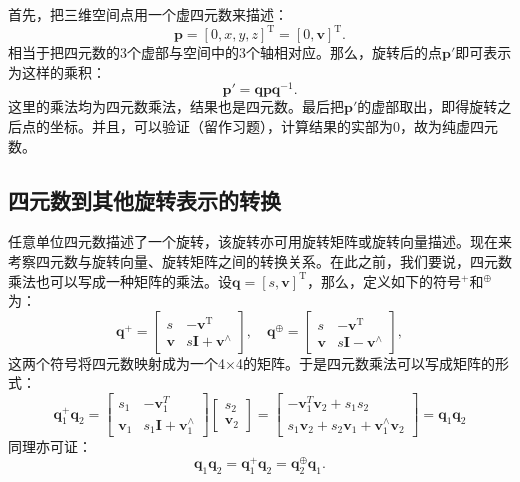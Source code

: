 首先，把三维空间点用一个虚四元数来描述：
\[
\bm{p} = [0, x, y, z]^\mathrm{T} = [0, \bm{v}]^\mathrm{T}. 
\]
相当于把四元数的3个虚部与空间中的3个轴相对应。那么，旋转后的点$\bm{p}'$即可表示为这样的乘积：
\begin{equation}\label{eq:rotate-with-quaternion}
\bm{p}' = \bm{q} \bm{p} \bm{q}^{-1}.
\end{equation}
这里的乘法均为四元数乘法，结果也是四元数。最后把$\bm{p}'$的虚部取出，即得旋转之后点的坐标。并且，可以验证（留作习题），计算结果的实部为0，故为纯虚四元数。

\subsection{四元数到其他旋转表示的转换}
任意单位四元数描述了一个旋转，该旋转亦可用旋转矩阵或旋转向量描述。现在来考察四元数与旋转向量、旋转矩阵之间的转换关系。在此之前，我们要说，四元数乘法也可以写成一种矩阵的乘法。设$\bm{q}=[s,\bm{v}]^\mathrm{T}$，那么，定义如下的符号$^{+}$和$^{\oplus}$为\textsuperscript{\cite{Barfoot2011}}：
\begin{equation}
\bm{q}^{+}=\left[\begin{array}{cc}
s&-\bm{v}^\mathrm{T} \\
\bm{v}&s\bm{I}+\bm{v}^{\wedge}
\end{array}\right],\quad 
\bm{q}^{\oplus}=
\left[\begin{array}{cc}
s & -\bm{v}^\mathrm{T} \\
\bm{v} & s\bm{I}-\bm{v}^{\wedge}
\end{array}\right],
\end{equation}
这两个符号将四元数映射成为一个4$\times$4的矩阵。于是四元数乘法可以写成矩阵的形式：
\begin{equation}
\bm{q}_1^ + {\bm{q}_2} = \left[ {\begin{array}{*{20}{c}}
	s_1&-\bm{v}_1^T\\
	\bm{v}_1 & s_1 \bm{I} + \bm{v}_1^\wedge
	\end{array}} \right]\left[ {\begin{array}{*{20}{c}}
	{{s _2}} \\
	{{\bm{v} _2}}
	\end{array}} \right] = \left[ {\begin{array}{*{20}{c}}
	{ - \bm{v} _1^T{\bm{v} _2} + {s _1}{s _2}} \\ 
	{{s _1}{\bm{v} _2} + {s _2}{\bm{v} _1} + \bm{v} _1^ \wedge {\bm{v} _2}}
	\end{array}} \right] = \bm{q}_1 \bm{q}_2
\end{equation}
同理亦可证：
\begin{equation}
\bm{q}_1 \bm{q}_2 = \bm{q}_1^{+} \bm{q}_2 = \bm{q}_2^{\oplus} \bm{q}_1.
\end{equation}

